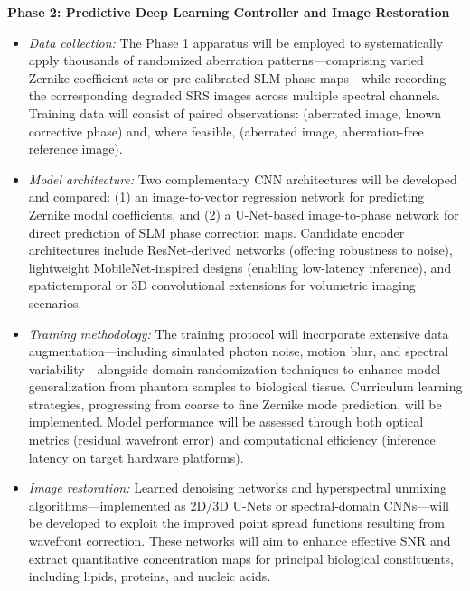 \documentclass[12pt,a4paper]{article}
\begin{document}
\textbf{Phase 2: Predictive Deep Learning Controller and Image Restoration}
\begin{itemize}
  \item \textit{Data collection:} The Phase 1 apparatus will be employed to systematically apply thousands of randomized aberration patterns—comprising varied Zernike coefficient sets or pre-calibrated SLM phase maps—while recording the corresponding degraded SRS images across multiple spectral channels. Training data will consist of paired observations: (aberrated image, known corrective phase) and, where feasible, (aberrated image, aberration-free reference image).
  \item \textit{Model architecture:} Two complementary CNN architectures will be developed and compared: (1) an image-to-vector regression network for predicting Zernike modal coefficients, and (2) a U-Net-based image-to-phase network for direct prediction of SLM phase correction maps. Candidate encoder architectures include ResNet-derived networks (offering robustness to noise), lightweight MobileNet-inspired designs (enabling low-latency inference), and spatiotemporal or 3D convolutional extensions for volumetric imaging scenarios.
  \item \textit{Training methodology:} The training protocol will incorporate extensive data augmentation—including simulated photon noise, motion blur, and spectral variability—alongside domain randomization techniques to enhance model generalization from phantom samples to biological tissue. Curriculum learning strategies, progressing from coarse to fine Zernike mode prediction, will be implemented. Model performance will be assessed through both optical metrics (residual wavefront error) and computational efficiency (inference latency on target hardware platforms).
  \item \textit{Image restoration:} Learned denoising networks and hyperspectral unmixing algorithms—implemented as 2D/3D U-Nets or spectral-domain CNNs—will be developed to exploit the improved point spread functions resulting from wavefront correction. These networks will aim to enhance effective SNR and extract quantitative concentration maps for principal biological constituents, including lipids, proteins, and nucleic acids.
\end{itemize}
\end{document}
